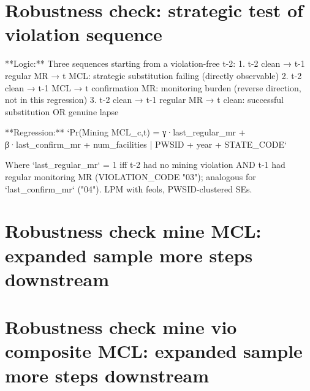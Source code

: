 \documentclass{beamer}
\begin{document}
\begin{frame}

\end{frame}

\section{Robustness check: strategic test of violation sequence}

\begin{frame}{}
**Logic:** Three sequences starting from a violation-free t-2:
1. t-2 clean → t-1 regular MR → t MCL: strategic substitution failing (directly observable)
2. t-2 clean → t-1 MCL → t confirmation MR: monitoring burden (reverse direction, not in this regression)
3. t-2 clean → t-1 regular MR → t clean: successful substitution OR genuine lapse

**Regression:** `Pr(Mining MCL_{c,t}) = γ·last_regular_mr + β·last_confirm_mr + num_facilities | PWSID + year + STATE_CODE`

Where `last_regular_mr` = 1 iff t-2 had no mining violation AND t-1 had regular monitoring MR (VIOLATION_CODE "03"); analogous for `last_confirm_mr` ("04"). LPM with feols, PWSID-clustered SEs.    
\end{frame}

\begin{frame}{}

\end{frame}

\section{Robustness check mine MCL: expanded sample more steps downstream}

\begin{frame}{}

\end{frame}

\begin{frame}{}

\end{frame}

\begin{frame}{}

\end{frame}

\begin{frame}{}

\end{frame}

\section{Robustness check mine vio composite MCL: expanded sample more steps downstream}
\end{document}
